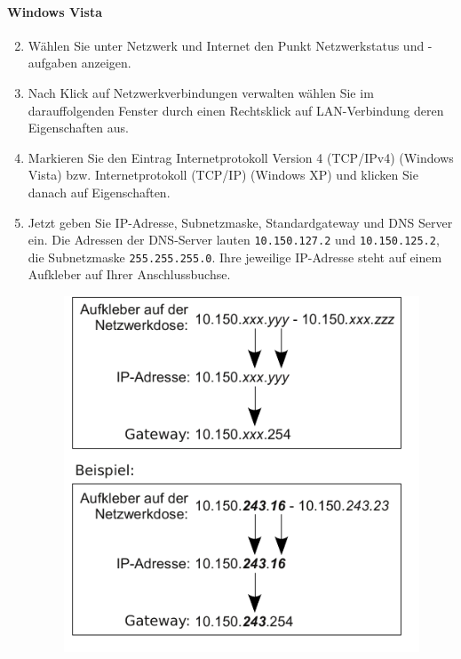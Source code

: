 \documentclass[a4paper,12pt,draft]{scrartcl}
\begin{document}
\paragraph*{Windows Vista}
\begin{enumerate}
    \setcounter{enumi}{1}
    \item Wählen Sie unter Netzwerk und Internet den Punkt Netzwerkstatus und -aufgaben anzeigen.
    \item Nach Klick auf Netzwerkverbindungen verwalten wählen Sie im darauffolgenden Fenster durch einen Rechtsklick auf LAN-Verbindung deren Eigenschaften aus.
    \setcounter{enumi}{4}
    \item Markieren Sie den Eintrag Internetprotokoll Version 4 (TCP/IPv4) (Windows Vista) bzw. Internetprotokoll  (TCP/IP) (Windows XP) und klicken Sie danach auf Eigenschaften.
    \item Jetzt geben Sie IP-Adresse, Subnetzmaske, Standardgateway und DNS Server ein. Die Adressen der DNS-Server lauten \nolinkurl{10.150.127.2} und \nolinkurl{10.150.125.2}, die Subnetzmaske \nolinkurl{255.255.255.0}. Ihre jeweilige IP-Adresse steht auf einem Aufkleber auf Ihrer Anschlussbuchse.
      \begin{figure}[h!]
	\centering
        \vspace{-5pt}
        \begin{minipage}[c]{0.45\linewidth}
          \centering
          \includegraphics[width=\linewidth,keepaspectratio]{Bilder/IP_Gerneric}

\end{minipage}
\end{figure}
\end{enumerate}
\end{document}
